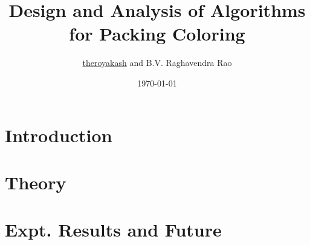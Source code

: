 \documentclass[aspectratio=169, compress]{beamer}
\title[Packing Coloring Algorithms\hspace{0.5cm}\insertframenumber/\inserttotalframenumber]{Design and Analysis of Algorithms for Packing Coloring}
\institute{\textsc{Indian Institute of Technology Madras}}
\author{\href{https://www.theroyakash.com}{theroyakash} and B.V. Raghavendra Rao}
\date{\today{}}
\begin{document}
\maketitle

\section{Introduction}


\section{Theory}



\section{Expt. Results and Future}

\end{document}
